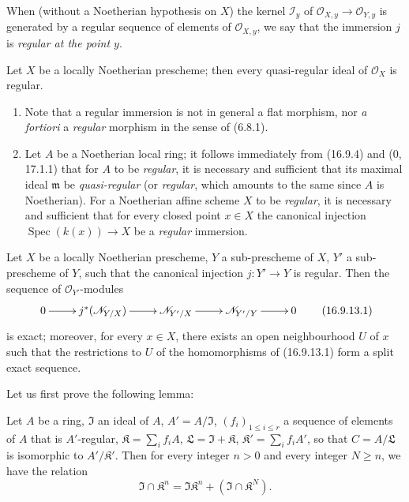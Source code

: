 When (without a Noetherian hypothesis on $X$) the kernel $\mathscr{I}_y$ of
$\mathcal{O}_{X,y}\to\mathcal{O}_{Y,y}$ is generated by a regular sequence
of elements of $\mathcal{O}_{X,y}$, we say that the immersion $j$ is
\emph{regular at the point $y$}.

\begin{corollary}[16.9.11]
\label{IV.16.9.11}
Let $X$ be a locally Noetherian prescheme; then every quasi-regular ideal of
$\mathcal{O}_X$ is regular.
\end{corollary}

\begin{remarks}[16.9.12]
\label{IV.16.9.12}
\begin{enumerate}
  \item[(i)] Note that a regular immersion is not in general a flat
  morphism, nor \emph{a fortiori} a \emph{regular} morphism in the sense of
  (6.8.1).
  \item[(ii)] Let $A$ be a Noetherian local ring; it follows immediately from
  (16.9.4) and (0, 17.1.1) that for $A$ to be \emph{regular}, it is
  necessary and sufficient that its maximal ideal $\mathfrak{m}$ be
  \emph{quasi-regular} (or \emph{regular}, which amounts to the same since $A$
  is Noetherian). For a Noetherian affine scheme $X$ to be \emph{regular}, it
  is necessary and sufficient that for every closed point $x\in X$ the
  canonical injection $\operatorname{Spec}(k(x))\to X$ be a \emph{regular}
  immersion.
\end{enumerate}
\end{remarks}

\begin{proposition}[16.9.13]
\label{IV.16.9.13}
Let $X$ be a locally Noetherian prescheme, $Y$ a sub-prescheme of $X$,
$Y'$ a sub-prescheme of $Y$, such that the canonical injection $j:Y'\to Y$ is
regular. Then the sequence of $\mathcal{O}_{Y'}$-modules
\[
  \xymatrix{
    0\ar[r] & j^*(\mathcal{N}_{Y/X})\ar[r]
      & \mathcal{N}_{Y'/X}\ar[r] & \mathcal{N}_{Y'/Y}\ar[r] & 0
  }
  \tag{16.9.13.1}
  \label{IV.16.9.13.1}
\]
is exact; moreover, for every $x\in X$, there exists an open neighbourhood $U$
of $x$ such that the restrictions to $U$ of the homomorphisms of (16.9.13.1)
form a split exact sequence.
\end{proposition}

Let us first prove the following lemma:

\begin{lemma}[16.9.13.2]
\label{IV.16.9.13.2}
Let $A$ be a ring, $\mathfrak{I}$ an ideal of $A$,
$A'=A/\mathfrak{I}$, $(f_i)_{1\leq i\leq r}$ a sequence of elements of $A$
that is $A'$-regular, $\mathfrak{K}=\sum_i f_iA$,
$\mathfrak{L}=\mathfrak{I}+\mathfrak{K}$,
$\mathfrak{K}'=\sum_i f_iA'$, so that $C=A/\mathfrak{L}$ is isomorphic to
$A'/\mathfrak{K}'$. Then for every integer $n>0$ and every integer $N\geq n$,
we have the relation
\[
  \mathfrak{I}\cap\mathfrak{K}^n
  =\mathfrak{I}\mathfrak{K}^n+(\mathfrak{I}\cap\mathfrak{K}^N).
  \tag{16.9.13.3}
  \label{IV.16.9.13.3}
\]
\end{lemma}

